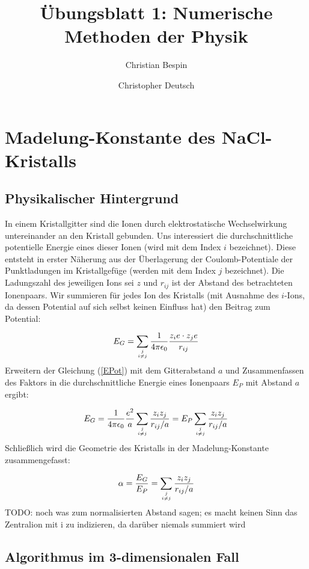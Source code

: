 \documentclass[10pt,a4paper]{article}
\author{Christian Bespin \and Christopher Deutsch}
\title{Übungsblatt 1: Numerische Methoden der Physik}
\begin{document}
\maketitle

\section{Madelung-Konstante des NaCl-Kristalls}
\subsection{Physikalischer Hintergrund}
In einem Kristallgitter sind die Ionen durch elektrostatische Wechselwirkung
untereinander an den Kristall gebunden. Uns interessiert die durchschnittliche
potentielle Energie eines dieser Ionen (wird mit dem Index $i$ bezeichnet).
Diese entsteht in erster Näherung aus der Überlagerung der Coulomb-Potentiale
der Punktladungen im Kristallgefüge
(werden mit dem Index $j$ bezeichnet). Die Ladungszahl des jeweiligen Ions sei $z$
und $r_{ij}$ ist der Abstand des betrachteten Ionenpaars. Wir summieren für
jedes Ion des Kristalls (mit Ausnahme des $i$-Ions, da dessen Potential auf sich
selbst keinen Einfluss hat) den Beitrag zum Potential:

\begin{align}
\label{EPot}
E_G = \sum_{j\atop i \neq j} \frac{1}{4 \pi \epsilon_0}
\frac{z_i e \cdot z_j e}{r_{ij}}
\end{align}
Erweitern der Gleichung (\ref{EPot}) mit dem Gitterabstand $a$ und
Zusammenfassen des Faktors in die durchschnittliche Energie eines Ionenpaars
$E_P$ mit Abstand $a$ ergibt:

\begin{align}
E_G = \frac{1}{4 \pi \epsilon_0} \frac{e^2}{a} \sum_{j\atop i \neq j}
\frac{z_i z_j}{r_{ij}/a} = E_P \sum_{j\atop i \neq j} \frac{z_i z_j}{r_{ij}/a}
\end{align}
Schließlich wird die Geometrie des Kristalls in der Madelung-Konstante
zusammengefasst:

\begin{align}
\label{Madelungkonstante}
\alpha = \frac{E_G}{E_P} = \sum_{j\atop i \neq j} \frac{z_i z_j}{r_{ij}/a}
\end{align}
TODO: noch was zum normalisierten Abstand sagen; es macht keinen Sinn das
Zentralion mit i zu indizieren, da darüber niemals summiert wird

\subsection{Algorithmus im 3-dimensionalen Fall}
\end{document}

